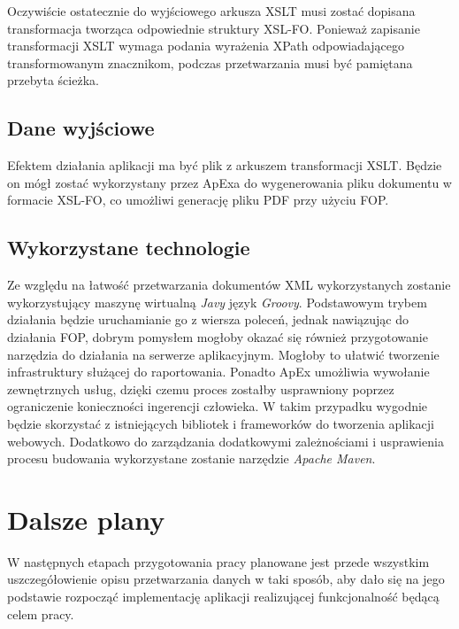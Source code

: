 \documentclass[11pt,a4paper]{article}
\begin{document}
Oczywiście ostatecznie do wyjściowego arkusza XSLT musi zostać dopisana transformacja tworząca odpowiednie struktury XSL-FO. Ponieważ zapisanie transformacji XSLT wymaga podania wyrażenia XPath odpowiadającego transformowanym znacznikom, podczas przetwarzania musi być pamiętana przebyta ścieżka.

\subsection{Dane wyjściowe}\label{sec:appOutput}
 Efektem działania aplikacji ma być plik z arkuszem transformacji XSLT. Będzie on mógł zostać wykorzystany przez ApExa do wygenerowania pliku dokumentu w formacie XSL-FO, co umożliwi generację pliku PDF przy użyciu FOP.

\subsection{Wykorzystane technologie} \label{sec:appTech}
Ze względu na łatwość przetwarzania dokumentów XML wykorzystanych zostanie wykorzystujący maszynę wirtualną \emph{Javy} język \emph{Groovy}. Podstawowym trybem działania będzie uruchamianie go z wiersza poleceń, jednak nawiązując do działania FOP, dobrym pomysłem mogłoby okazać się również przygotowanie narzędzia do działania na serwerze aplikacyjnym. Mogłoby to ułatwić tworzenie infrastruktury służącej do raportowania. Ponadto ApEx umożliwia wywołanie zewnętrznych usług, dzięki czemu proces zostałby usprawniony poprzez ograniczenie konieczności ingerencji człowieka. W takim przypadku wygodnie będzie skorzystać z istniejących bibliotek i frameworków do tworzenia aplikacji webowych. Dodatkowo do zarządzania dodatkowymi zależnościami i usprawienia procesu budowania wykorzystane zostanie narzędzie \emph{Apache Maven}.

\section{Dalsze plany}\label{sec:plany}
W następnych etapach przygotowania pracy planowane jest przede wszystkim uszczegółowienie opisu przetwarzania danych w taki sposób, aby dało się na jego podstawie rozpocząć implementację aplikacji realizującej funkcjonalność będącą celem pracy. 
\end{document}
